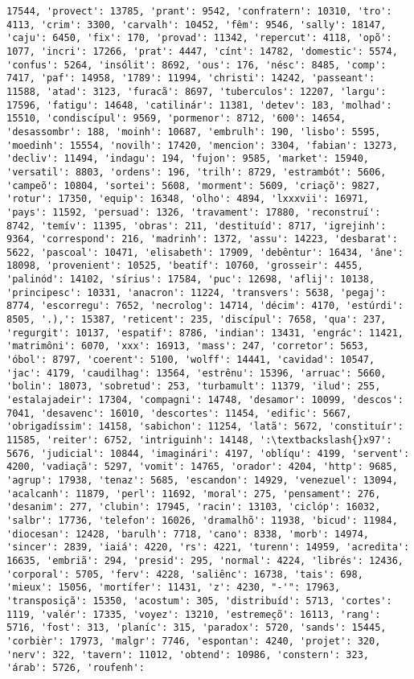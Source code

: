 \begin{Verbatim}[commandchars=\\\{\}]
17544, 'provect': 13785, 'prant': 9542, 'confratern': 10310, 'tro': 4113, 'crim': 3300, 'carvalh': 10452, 'fêm': 9546, 'sally': 18147, 'caju': 6450, 'fix': 170, 'provad': 11342, 'repercut': 4118, 'opõ': 1077, 'incri': 17266, 'prat': 4447, 'cínt': 14782, 'domestic': 5574, 'confus': 5264, 'insólit': 8692, 'ous': 176, 'nésc': 8485, 'comp': 7417, 'paf': 14958, '1789': 11994, 'christi': 14242, 'passeant': 11588, 'atad': 3123, 'furacã': 8697, 'tuberculos': 12207, 'largu': 17596, 'fatigu': 14648, 'catilinár': 11381, 'detev': 183, 'molhad': 15510, 'condiscípul': 9569, 'pormenor': 8712, '600': 14654, 'desassombr': 188, 'moinh': 10687, 'embrulh': 190, 'lisbo': 5595, 'moedinh': 15554, 'novilh': 17420, 'mencion': 3304, 'fabian': 13273, 'decliv': 11494, 'indagu': 194, 'fujon': 9585, 'market': 15940, 'versatil': 8803, 'ordens': 196, 'trilh': 8729, 'estrambót': 5606, 'campeõ': 10804, 'sortei': 5608, 'morment': 5609, 'criaçõ': 9827, 'rotur': 17350, 'equip': 16348, 'olho': 4894, 'lxxxvii': 16971, 'pays': 11592, 'persuad': 1326, 'travament': 17880, 'reconstruí': 8742, 'temív': 11395, 'obras': 211, 'destituíd': 8717, 'igrejinh': 9364, 'correspond': 216, 'madrinh': 1372, 'assu': 14223, 'desbarat': 5622, 'pascoal': 10471, 'elisabeth': 17909, 'debêntur': 16434, 'âne': 18098, 'provenient': 10525, 'beatíf': 10760, 'grosseir': 4455, 'palinód': 14102, 'sírius': 17584, 'puc': 12698, 'aflij': 10138, 'principesc': 10331, 'anacron': 11224, 'transvers': 5638, 'pegaj': 8774, 'escorregu': 7652, 'necrolog': 14714, 'décim': 4170, 'estúrdi': 8505, '.),': 15387, 'reticent': 235, 'discípul': 7658, 'qua': 237, 'regurgit': 10137, 'espatif': 8786, 'indian': 13431, 'engrác': 11421, 'matrimôni': 6070, 'xxx': 16913, 'mass': 247, 'corretor': 5653, 'óbol': 8797, 'coerent': 5100, 'wolff': 14441, 'cavidad': 10547, 'jac': 4179, 'caudilhag': 13564, 'estrênu': 15396, 'arruac': 5660, 'bolin': 18073, 'sobretud': 253, 'turbamult': 11379, 'ilud': 255, 'estalajadeir': 17304, 'compagni': 14748, 'desamor': 10099, 'descos': 7041, 'desavenc': 16010, 'descortes': 11454, 'edific': 5667, 'obrigadíssim': 14158, 'sabichon': 11254, 'latã': 5672, 'constituír': 11585, 'reiter': 6752, 'intriguinh': 14148, ':\textbackslash{}x97': 5676, 'judicial': 10844, 'imaginári': 4197, 'oblíqu': 4199, 'servent': 4200, 'vadiaçã': 5297, 'vomit': 14765, 'orador': 4204, 'http': 9685, 'agrup': 17938, 'tenaz': 5685, 'escandon': 14929, 'venezuel': 13094, 'acalcanh': 11879, 'perl': 11692, 'moral': 275, 'pensament': 276, 'desanim': 277, 'clubin': 17945, 'racin': 13103, 'ciclóp': 16032, 'salbr': 17736, 'telefon': 16026, 'dramalhõ': 11938, 'bicud': 11984, 'diocesan': 12428, 'barulh': 7718, 'cano': 8338, 'morb': 14974, 'sincer': 2839, 'iaiá': 4220, 'rs': 4221, 'turenn': 14959, 'acredita': 16635, 'embriã': 294, 'presid': 295, 'normal': 4224, 'librés': 12436, 'corporal': 5705, 'ferv': 4228, 'saliênc': 16738, 'tais': 698, 'mieux': 15056, 'mortífer': 11431, 'z': 4230, "-'": 17963, 'transposiçã': 15350, 'acostum': 305, 'distribuíd': 5713, 'cortes': 1119, 'valér': 17335, 'voyez': 13210, 'estremeçõ': 16113, 'rang': 5716, 'fost': 313, 'planíc': 315, 'paradox': 5720, 'sands': 15445, 'corbièr': 17973, 'malgr': 7746, 'espontan': 4240, 'projet': 320, 'nerv': 322, 'tavern': 11012, 'obtend': 10986, 'constern': 323, 'árab': 5726, 'roufenh': 
\end{Verbatim}
